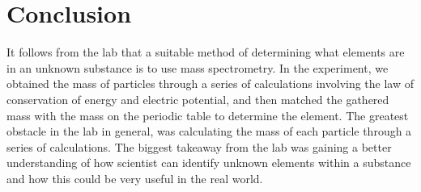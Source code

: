 \documentclass[12pt]{article}
\begin{document}
\section{Conclusion}
It follows from the lab that a suitable method of determining what elements are in an unknown substance is to use mass spectrometry. In the experiment, we obtained the mass of particles through a series of calculations involving the law of conservation of energy and electric potential, and then matched the gathered mass with the mass on the periodic table to determine the element. The greatest obstacle in the lab in general, was calculating the mass of each particle through a series of calculations. The biggest takeaway from the lab was gaining a better understanding of how scientist can identify unknown elements within a substance and how this could be very useful in the real world.
\end{document}
